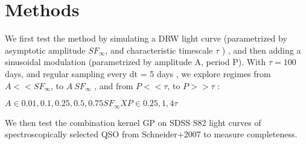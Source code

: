 \documentclass[fleqn,usenatbib]{mnras}  %
\begin{document}
\section{Methods}
 We first test the method by simulating a DRW light curve (parametrized by asymptotic amplitude $SF_{\infty}$, and characteristic timescale $\tau$ ) , and then adding a sinusoidal modulation (parametrized by amplitude A, period P). With $\tau  = 100 $ days, and regular sampling every dt = 5 days  , we explore regimes from $A << SF_{\infty}$,  to $A ~ SF_{\infty}$ , and from $P << \tau$, to $P >> \tau$ : 

$A \in { 0.01,  0.1,  0.25,  0.5, 0.75 } SF_{\infty}       X P \in { 0.25,  1 ,  4 } \tau   $

We then test the combination kernel GP on SDSS S82 light curves of spectroscopically selected QSO from Schneider+2007 to measure completeness. 





%



\bsp	%
\label{lastpage}
\end{document}

